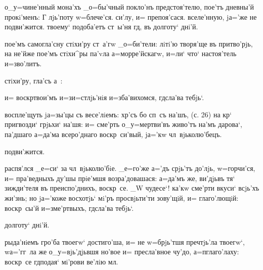о_у=чине'нный мона'хъ _о=бы'чный покло'нъ предстоя'телю, 
пое'тъ дневны'й прокi'менъ: Г%
лjь'поту w=блече'ся. %
си'лу, и= препоя'сася. %
вселе'нную, jа='же не подви'жится. %
твоему` подоба'етъ ст~ы'ня гд, въ долготу` днi'й.

пое'мъ самогла'сну стiхи'ру ст~а'гw _о=би'тели: лiтi'ю 
творя'ще въ притво'рjь, на не'йже пое'мъ стiхи^ры па'vла 
а=морре'йскагw, и=ли` что` настоя'тель и=зво'литъ.%

стiхи'ру, гла'съ а~:%

и= воскр твои'мъ и=з\ъ и=стлjь'нiя и=зба'вихомся, 
гд сла'ва тебjь`.



воспле'щуть jа=зы'цы съ весе'лiемъ: хр'съ бо сп~съ 
на'шъ, (с. 26) на кр` пригвозди` грjьхи` на'шя: и= 
сме'рть о_у=мертви'въ живо'тъ на'мъ дарова`, па'дшаго 
а=да'ма всеро'днаго воскр~си'вый, jа='кw чл~вjьколю'бецъ.

подви'жится.

распя'лся _е=си` за чл~вjьколю'бiе. _е=го'же а='дъ 
срjь'тъ до'лjь, w=горчи'ся, и= пра'ведныхъ ду'шы прiе'мшя 
возра'довашася: а=да'мъ же, ви'дjьвъ тя` зижди'теля въ 
преиспо'днихъ, воскр~се. _W чудесе`! ка'кw сме'рти вкуси` 
всjь'хъ жи'знь; но jа='коже восхотjь` мi'ръ просвjьти'ти 
зову'щiй, и= глаго'лющiй: воскр~сы'й и=з\ъ ме'ртвыхъ, 
гд сла'ва тебjь`.

долготу` днi'й.

рыда'нiемъ гро'ба твоегw` достиго'ша, и= не w=брjь'тшя 
преч тjь'ла твоегw`, w\т а='гг~ла же о_у=вjь'дjьвшя 
но'вое и= пресла'вное чу'до, а=п глаго'лаху: 
воскр~се гд подая` мi'рови ве'лiю мл.


